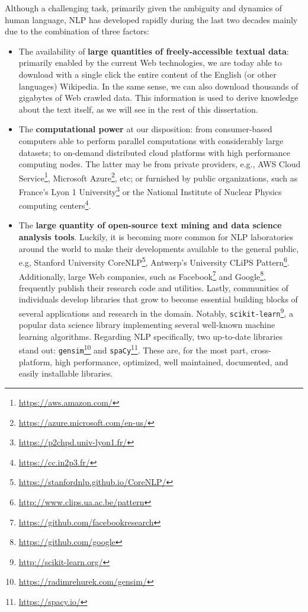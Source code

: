 Although a challenging task, primarily given the ambiguity and dynamics of human language, NLP has developed rapidly \cite{ClarkBook2010} during the last two decades mainly due to the combination of three factors: 
\begin{itemize}
\item The  availability of \textbf{large quantities of freely-accessible textual data}: primarily enabled by the current Web technologies, we are today able to download with a single click the entire content of the English (or other languages) Wikipedia. In the same sense, we can also download thousands of gigabytes of Web crawled data. This information is used to derive knowledge about the text itself, as we will see in the rest of this dissertation. 
\item The \textbf{computational power} at our disposition: from consumer-based computers able to perform parallel computations with considerably large datasets; to on-demand distributed cloud platforms with high performance computing nodes. The latter may be from private providers, e.g., AWS Cloud Service\footnote{\url{https://aws.amazon.com/}}, Microsoft Azure\footnote{\url{https://azure.microsoft.com/en-us/}}, etc; or furnished by public organizations, such as France's Lyon 1 University\footnote{\url{https://p2chpd.univ-lyon1.fr/}} or the National Institute of Nuclear Physics computing centers\footnote{\url{https://cc.in2p3.fr/}}.

\item  The \textbf{large quantity of open-source text mining and data science analysis tools}. Luckily, it is becoming more common for NLP laboratories around the world to make their developments available to the general public, e.g, Stanford University CoreNLP\footnote{\url{https://stanfordnlp.github.io/CoreNLP/}}, Antwerp's University CLiPS Pattern\footnote{\url{http://www.clips.ua.ac.be/pattern}}.
Additionally, large Web companies, such as Facebook\footnote{\url{https://github.com/facebookresearch}} and Google\footnote{\url{https://github.com/google}}, frequently publish their research code and utilities. Lastly, communities of individuals develop libraries that grow to become essential building blocks of several applications and research in the domain. Notably, \texttt{scikit-learn}\footnote{\url{http://scikit-learn.org/}}, a popular data science library implementing several well-known machine learning algorithms. Regarding NLP specifically, two up-to-date libraries stand out:  \texttt{gensim}\footnote{\url{https://radimrehurek.com/gensim/}} and \texttt{spaCy}\footnote{\url{https://spacy.io/}}. These are, for the most part, cross-platform, high performance, optimized, well maintained, documented, and easily installable libraries.

\end{itemize} 
